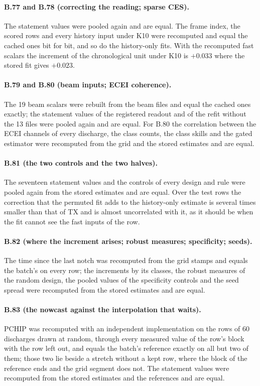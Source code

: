 \documentclass[11pt,a4paper]{article}
\begin{document}
\paragraph{B.77 and B.78 (correcting the reading; sparse CES).} The statement values were
pooled again and are equal. The frame index, the scored rows and every history input under
K10 were recomputed and equal the cached ones bit for bit, and so do the history-only
fits. With the recomputed fast scalars the increment of the chronological unit under K10
is $+0.033$ where the stored fit gives $+0.023$.

\paragraph{B.79 and B.80 (beam inputs; ECEI coherence).} The 19 beam scalars were rebuilt
from the beam files and equal the cached ones exactly; the statement values of the
registered readout and of the refit without the 13 files were pooled again and are equal.
For B.80 the correlation between the ECEI channels of every discharge, the class counts,
the class skills and the gated estimator were recomputed from the grid and the stored
estimates and are equal.

\paragraph{B.81 (the two controls and the two halves).} The seventeen statement values
and the controls of every design and rule were pooled again from the stored estimates and
are equal. Over the test rows the correction that the permuted fit adds to the
history-only estimate is several times smaller than that of TX and is almost uncorrelated
with it, as it should be when the fit cannot see the fast inputs of the row.

\paragraph{B.82 (where the increment arises; robust measures; specificity; seeds).} The
time since the last notch was recomputed from the grid stamps and equals the batch's on
every row; the increments by its classes, the robust measures of the random design, the
pooled values of the specificity controls and the seed spread were recomputed from the
stored estimates and are equal.

\paragraph{B.83 (the nowcast against the interpolation that waits).} PCHIP was recomputed
with an independent implementation on the rows of 60 discharges drawn at random, through
every measured value of the row's block with the row left out, and equals the batch's
reference exactly on all but two of them; those two lie beside a stretch without a kept
row, where the block of the reference ends and the grid segment does not. The statement
values were recomputed from the stored estimates and the references and are equal.
\end{document}
